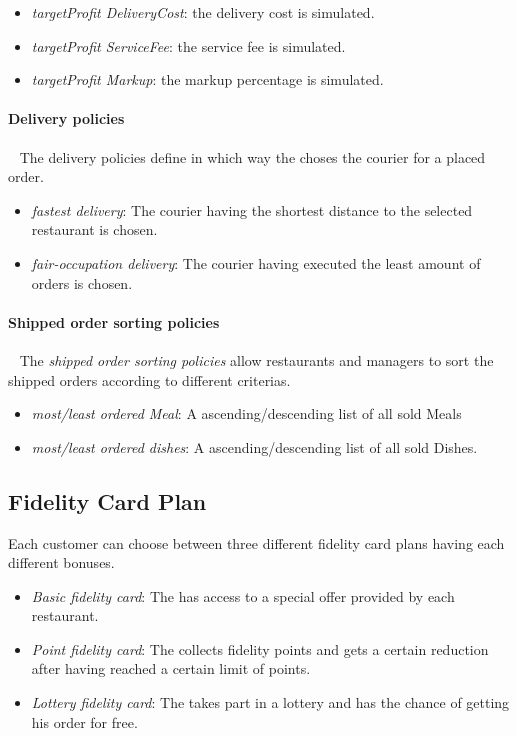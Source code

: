 \begin{itemize}
    \item \emph{targetProfit DeliveryCost}: the delivery cost is simulated.
    \item \emph{targetProfit ServiceFee}: the service fee is simulated.
    \item \emph{targetProfit Markup}: the markup percentage is simulated.
\end{itemize}

\paragraph{Delivery policies}~\vspace{0.3\baselineskip}
The delivery policies define in which way the \Core choses the courier for a placed order.

\begin{itemize}
    \item \emph{fastest delivery}: The courier having the shortest distance to the selected restaurant is chosen.
    \item \emph{fair-occupation delivery}: The courier having executed the least amount of orders is chosen.
\end{itemize}

\paragraph{Shipped order sorting policies}~\vspace{0.3\baselineskip}
The \emph{shipped order sorting policies} allow restaurants and managers to sort the shipped orders according to different criterias.

\begin{itemize}
    \item \emph{most/least ordered Meal}: A ascending/descending list of all sold Meals
    \item \emph{most/least ordered dishes}: A ascending/descending list of all sold Dishes.
\end{itemize}

\subsection{Fidelity Card Plan} %
\label{sub:fid_card_plan}

Each customer can choose between three different fidelity card plans having each different bonuses.

\begin{itemize}
    \item \emph{Basic fidelity card}: The \Customer has access to a special offer provided by each restaurant.
    \item \emph{Point fidelity card}: The \Customer collects fidelity points and gets a certain reduction after 
	having reached a certain limit of points.
	\item \emph{Lottery fidelity card}: The \Customer takes part in a lottery and has the chance of getting his order for free.
\end{itemize}

